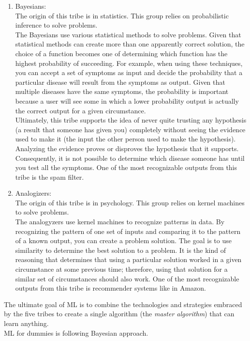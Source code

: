 \begin{enumerate}
	\item Bayesians:\\
	The origin of this tribe is in statistics. This group relies on probabilistic inference to solve problems.\\
	The Bayesians use various statistical methods to solve problems. Given that statistical methods can create more than one apparently correct solution, the choice of a function becomes one of determining which function has the highest probability of succeeding. For example, when using these techniques, you can accept a set of symptoms as input and decide the probability that a particular disease will result from the symptoms as output. Given that multiple diseases have the same symptoms, the probability is important because a user will see some in which a lower probability output is actually the correct output for a given circumstance.\\
	Ultimately, this tribe supports the idea of never quite trusting any hypothesis (a result that someone has given you) completely without seeing the evidence used to make it (the input the other person used to make the hypothesis). Analyzing the evidence proves or disproves the hypothesis that it supports. Consequently, it is not possible to determine which disease someone has until you test all the symptoms. One of the most recognizable outputs from this tribe is the spam filter.
	\item Analogizers:\\
	The origin of this tribe is in psychology. This group relies on kernel machines to solve problems.\\
	The analogyzers use kernel machines to recognize patterns in data. By recognizing the pattern of one set of inputs and comparing it to the pattern of a known output, you can create a problem solution. The goal is to use similarity to determine the best solution to a problem. It is the kind of reasoning that determines that using a particular solution worked in a given circumstance at some previous time; therefore, using that solution for a similar set of circumstances should also work. One of the most recognizable outputs from this tribe is recommender systems like in Amazon.
\end{enumerate}
The ultimate goal of ML is to combine the technologies and strategies embraced by the five tribes to create a single algorithm (the \emph{master algorithm}) that can learn anything.\\
ML for dummies is following Bayesian approach.
